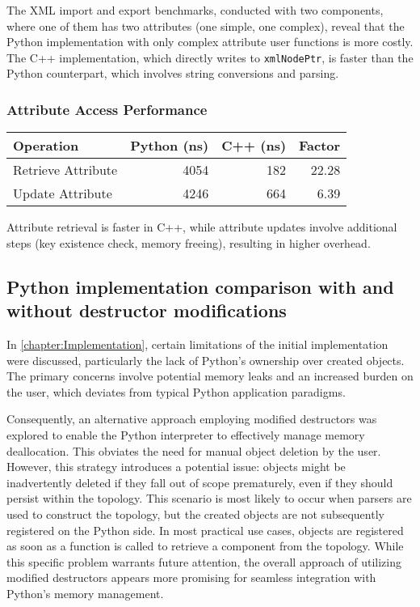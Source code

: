 The XML import and export benchmarks, conducted with two components, where one of them has two attributes (one simple, one complex), reveal that the Python implementation with only complex attribute user functions is more costly. The C++ implementation, which directly writes to \texttt{xmlNodePtr}, is faster than the Python counterpart, which involves string conversions and parsing.

\subsubsection{Attribute Access Performance}

\begin{center}
\begin{tabular}{lrrr}
\textbf{Operation} & \textbf{Python (ns)} & \textbf{C++ (ns)} & \textbf{Factor} \\
\hline
Retrieve Attribute & 4054 & 182 & 22.28 \\
Update Attribute & 4246 & 664 & 6.39 \\
\end{tabular}
\end{center}

Attribute retrieval is faster in C++, while attribute updates involve additional steps (key existence check, memory freeing), resulting in higher overhead.

\subsection{Python implementation comparison with and without destructor modifications}

In \autoref{chapter:Implementation}, certain limitations of the initial implementation were discussed, particularly the lack of Python's ownership over created objects. The primary concerns involve potential memory leaks and an increased burden on the user, which deviates from typical Python application paradigms.

Consequently, an alternative approach employing modified destructors was explored to enable the Python interpreter to effectively manage memory deallocation. This obviates the need for manual object deletion by the user. However, this strategy introduces a potential issue: objects might be inadvertently deleted if they fall out of scope prematurely, even if they should persist within the topology. This scenario is most likely to occur when parsers are used to construct the topology, but the created objects are not subsequently registered on the Python side. In most practical use cases, objects are registered as soon as a function is called to retrieve a component from the topology. While this specific problem warrants future attention, the overall approach of utilizing modified destructors appears more promising for seamless integration with Python's memory management.
